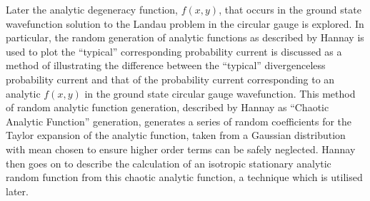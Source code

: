 Later the analytic degeneracy function, $f(x,y)$, that occurs in the ground state
wavefunction solution to the Landau problem in the circular gauge is explored.
In particular, the random generation of analytic functions as described by
Hannay \cite{hannay} is used to plot the
``typical'' corresponding probability current is discussed as a method of
illustrating the difference between the ``typical'' divergenceless probability
current and that of the probability current corresponding to an analytic
$f(x,y)$ in the ground state circular gauge wavefunction. This method of random
analytic function generation, described by Hannay as ``Chaotic Analytic
Function'' generation, generates a series of random coefficients
for the Taylor expansion of the analytic function, taken from a Gaussian
distribution with mean chosen to ensure higher order terms can be safely
neglected. Hannay then goes on to describe the calculation of an isotropic
stationary analytic random function from this chaotic analytic function, a
technique which is utilised later.
